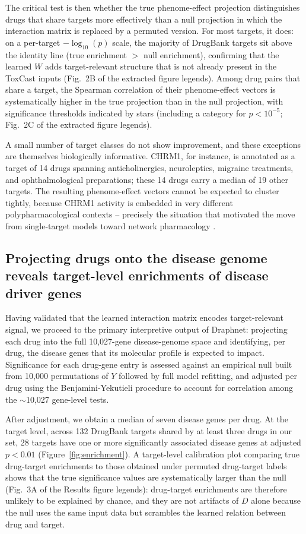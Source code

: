 \documentclass[11pt]{article}
\begin{document}
The critical test is then whether the true phenome-effect projection
distinguishes drugs that share targets more effectively than a null
projection in which the interaction matrix is replaced by a permuted
version. For most targets, it does: on a per-target $-\log_{10}(p)$
scale, the majority of DrugBank targets sit above the identity line
(true enrichment $>$ null enrichment), confirming that the learned $W$
adds target-relevant structure that is not already present in the
ToxCast inputs (Fig.~2B of the extracted figure legends). Among drug
pairs that share a target, the Spearman correlation of their
phenome-effect vectors is systematically higher in the true projection
than in the null projection, with significance thresholds indicated by
stars (including a category for $p<10^{-5}$; Fig.~2C of the extracted
figure legends).

A small number of target classes do not show improvement, and these
exceptions are themselves biologically informative. CHRM1, for
instance, is annotated as a target of 14 drugs spanning
anticholinergics, neuroleptics, migraine treatments, and ophthalmological
preparations; these 14 drugs carry a median of 19 other targets. The
resulting phenome-effect vectors cannot be expected to cluster
tightly, because CHRM1 activity is embedded in very different
polypharmacological contexts -- precisely the situation that motivated
the move from single-target models toward network pharmacology
\citep{hopkins2008network}.

\subsection{Projecting drugs onto the disease genome reveals target-level
enrichments of disease driver genes}

Having validated that the learned interaction matrix encodes
target-relevant signal, we proceed to the primary interpretive output
of Draphnet: projecting each drug into the full 10,027-gene
disease-genome space and identifying, per drug, the disease genes that
its molecular profile is expected to impact. Significance for each
drug-gene entry is assessed against an empirical null built from 10,000
permutations of $Y$ followed by full model refitting, and adjusted per
drug using the Benjamini-Yekutieli procedure to account for correlation
among the $\sim$10,027 gene-level tests.

After adjustment, we obtain a median of seven disease genes per drug.
At the target level, across 132 DrugBank targets shared by at least
three drugs in our set, 28 targets have one or more significantly
associated disease genes at adjusted $p<0.01$
(Figure~\ref{fig:enrichment}). A target-level calibration plot
comparing true drug-target enrichments to those obtained under
permuted drug-target labels shows that the true significance values are
systematically larger than the null (Fig.~3A of the Results figure
legends): drug-target enrichments are therefore unlikely to be explained
by chance, and they are not artifacts of $D$ alone because the null
uses the same input data but scrambles the learned relation between
drug and target.
\end{document}
